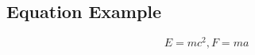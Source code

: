 \documentclass[10pt]{article}
\begin{document}
\begin{multicols*}{4}

\section*{Equation Example}
\lipsum[1]
$$
E = mc^2, F = ma
$$
\lipsum[2]

\end{multicols*}
\end{document}
